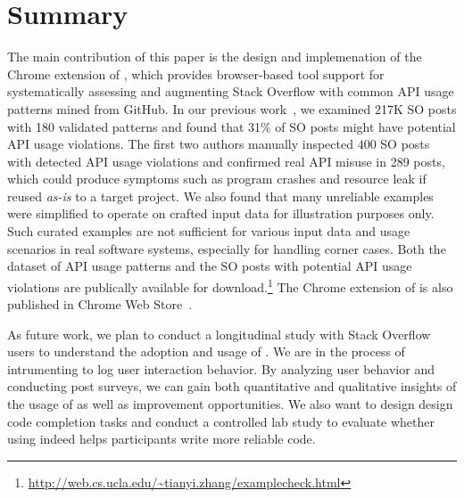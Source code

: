 \section{Summary}
\label{sec:summary}
The main contribution of this paper is the design and implemenation of the Chrome extension of {\tool}, which provides browser-based tool support for systematically assessing and augmenting Stack Overflow with common API usage patterns mined from GitHub. In our previous work~\cite{zhang2018code}, we examined 217K SO posts with 180 validated patterns and found that 31\% of SO posts might have potential API usage violations. The first two authors manually inspected 400 SO posts with detected API usage violations and confirmed real API misuse in 289 posts, which could produce symptoms such as program crashes and resource leak if reused {\em as-is} to a target project. We also found that many unreliable examples were simplified to operate on crafted input data for illustration purposes only. Such curated examples are not sufficient for various input data and usage scenarios in real software systems, especially for handling corner cases. Both the dataset of API usage patterns and the SO posts with potential API usage violations are publically available for download.\footnote{\url{http://web.cs.ucla.edu/~tianyi.zhang/examplecheck.html}} The Chrome extension of {\tool} is also published in Chrome Web Store~\cite{examplecheck}.


As future work, we plan to conduct a longitudinal study with Stack Overflow users to understand the adoption and usage of {\tool}. We are in the process of intrumenting {\tool} to log user interaction behavior. By analyzing user behavior and conducting post surveys, we can gain both quantitative and qualitative insights of the usage of {\tool} as well as improvement opportunities. We also want to design design code completion tasks and conduct a controlled lab study to evaluate whether using {\tool} indeed helps participants write more reliable code.